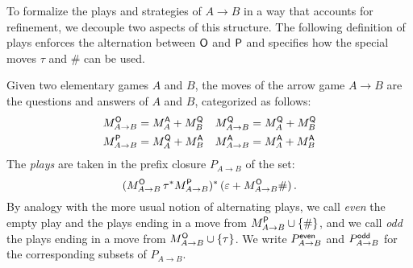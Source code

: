 
To formalize the plays and strategies of $A \rightarrow B$
in a way that accounts for refinement,
we decouple two aspects of this structure.
The following definition of plays
enforces the alternation between $ \mathsf{O} $ and $ \mathsf{P} $
and specifies how the special moves $\tau$ and $\#$ can be used.

\begin{definition}
Given two elementary games $A$ and $B$,
the moves of the arrow game $A \rightarrow B$
are the questions and answers of $A$ and $B$,
categorized as follows:
\begin{align*}
  M_{A \rightarrow B}^{ \mathsf{O} } &= M_A^{ \mathsf{A} } + M_B^{ \mathsf{Q} } &
  M_{A \rightarrow B}^{ \mathsf{Q} } &= M_A^{ \mathsf{Q} } + M_B^{ \mathsf{Q} } \\
  M_{A \rightarrow B}^{ \mathsf{P} } &= M_A^{ \mathsf{Q} } + M_B^{ \mathsf{A} } &
  M_{A \rightarrow B}^{ \mathsf{A} } &= M_A^{ \mathsf{A} } + M_B^{ \mathsf{A} }
\end{align*}
The \emph{plays} are taken in
the prefix closure $P_{A \rightarrow B}$ of the set:
\[
    (M_{A \rightarrow B}^{ \mathsf{O} } \, \tau^*
     M_{A \rightarrow B}^{ \mathsf{P} })^* \,
    (\varepsilon + M_{A \rightarrow B}^{ \mathsf{O} } \#) \,.
\]
By analogy with the more usual notion of alternating plays,
we call \emph{even}
the empty play and the plays ending in
a move from $M_{A \rightarrow B}^{ \mathsf{P} } \cup \{\#\}$, and
we call \emph{odd} the plays ending in
a move from $M_{A \rightarrow B}^{ \mathsf{O} } \cup \{\tau\}$.
We write $P_{A \rightarrow B}^{ \mathsf{even} }$ and $P_{A \rightarrow B}^{ \mathsf{odd} }$
for the corresponding subsets of $P_{A \rightarrow B}$.
\end{definition}

